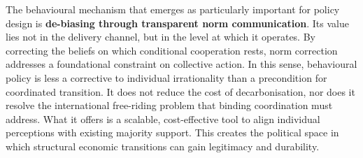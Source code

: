\documentclass[11pt,a4paper]{scrartcl}
\numberwithin{equation}{section}
\theoremstyle{definition}
\theoremstyle{remark}
\begin{document}
    The behavioural mechanism that emerges as particularly important for policy design is \textbf{de-biasing through transparent norm communication}. Its value lies not in the delivery channel, but in the level at which it operates. By correcting the beliefs on which conditional cooperation rests, norm correction addresses a foundational constraint on collective action. In this sense, behavioural policy is less a corrective to individual irrationality than a precondition for coordinated transition. It does not reduce the cost of decarbonisation, nor does it resolve the international free-riding problem that binding coordination must address. What it offers is a scalable, cost-effective tool to align individual perceptions with existing majority support. This creates the political space in which structural economic transitions can gain legitimacy and durability.

\newpage
{}
\printbibliography
\end{document}
